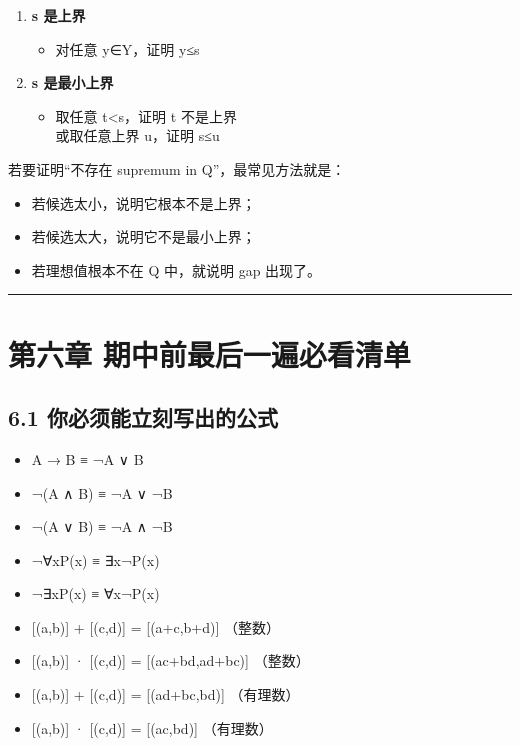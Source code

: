 \documentclass[
  11pt,
]{article}
\providecommand{\tightlist}{%
  \setlength{\itemsep}{0pt}\setlength{\parskip}{0pt}}
\begin{document}
\begin{enumerate}
\def\labelenumi{\arabic{enumi}.}
\tightlist
\item
  \textbf{s 是上界}

  \begin{itemize}
  \tightlist
  \item
    对任意 y∈Y，证明 y≤s
  \end{itemize}
\item
  \textbf{s 是最小上界}

  \begin{itemize}
  \tightlist
  \item
    取任意 t\textless s，证明 t 不是上界\\
    或取任意上界 u，证明 s≤u
  \end{itemize}
\end{enumerate}

若要证明``不存在 supremum in Q''，最常见方法就是：

\begin{itemize}
\tightlist
\item
  若候选太小，说明它根本不是上界；
\item
  若候选太大，说明它不是最小上界；
\item
  若理想值根本不在 Q 中，就说明 gap 出现了。
\end{itemize}

\begin{center}\rule{0.5\linewidth}{0.5pt}\end{center}

\section{第六章
期中前最后一遍必看清单}\label{ux7b2cux516dux7ae0-ux671fux4e2dux524dux6700ux540eux4e00ux904dux5fc5ux770bux6e05ux5355}

\subsection{6.1
你必须能立刻写出的公式}\label{ux4f60ux5fc5ux987bux80fdux7acbux523bux5199ux51faux7684ux516cux5f0f}

\begin{itemize}
\tightlist
\item
  A → B ≡ ¬A ∨ B
\item
  ¬(A ∧ B) ≡ ¬A ∨ ¬B
\item
  ¬(A ∨ B) ≡ ¬A ∧ ¬B
\item
  ¬∀xP(x) ≡ ∃x¬P(x)
\item
  ¬∃xP(x) ≡ ∀x¬P(x)
\item
  {[}(a,b){]} + {[}(c,d){]} = {[}(a+c,b+d){]} （整数）
\item
  {[}(a,b){]} · {[}(c,d){]} = {[}(ac+bd,ad+bc){]} （整数）
\item
  {[}(a,b){]} + {[}(c,d){]} = {[}(ad+bc,bd){]} （有理数）
\item
  {[}(a,b){]} · {[}(c,d){]} = {[}(ac,bd){]} （有理数）
\end{itemize}
\end{document}
